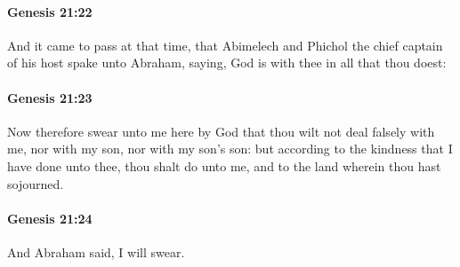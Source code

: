 		\paragraph{Genesis 21:22} %
			\label{GENESIS-21-22}

			And it came to pass at that time, that Abimelech and Phichol the chief captain of his host spake unto Abraham, saying, God is with thee in all that thou doest:


		\paragraph{Genesis 21:23} %
			\label{GENESIS-21-23}

			Now therefore swear unto me here by God that thou wilt not deal falsely with me, nor with my son, nor with my son's son: but according to the kindness that I have done unto thee, thou shalt do unto me, and to the land wherein thou hast sojourned.


		\paragraph{Genesis 21:24} %
			\label{GENESIS-21-24}

			And Abraham said, I will swear.


